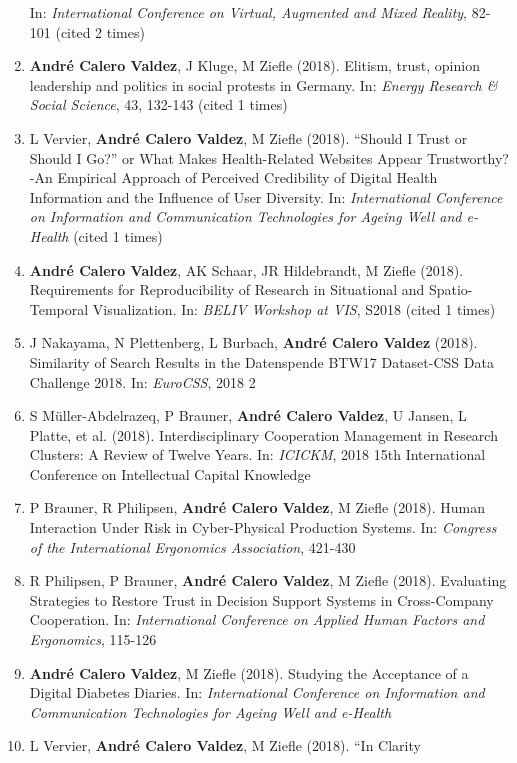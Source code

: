 \documentclass[11pt,a4paper,sans]{moderncv}
\begin{document}
\begin{enumerate}
  In: \emph{International Conference on Virtual, Augmented and Mixed
  Reality}, 82-101 (cited 2 times)
\item
  \textbf{André Calero Valdez}, J Kluge, M Ziefle (2018). Elitism,
  trust, opinion leadership and politics in social protests in Germany.
  In: \emph{Energy Research \& Social Science}, 43, 132-143 (cited 1
  times)
\item
  L Vervier, \textbf{André Calero Valdez}, M Ziefle (2018). ``Should I
  Trust or Should I Go?'' or What Makes Health-Related Websites Appear
  Trustworthy?-An Empirical Approach of Perceived Credibility of Digital
  Health Information and the Influence of User Diversity. In:
  \emph{International Conference on Information and Communication
  Technologies for Ageing Well and e-Health} (cited 1 times)
\item
  \textbf{André Calero Valdez}, AK Schaar, JR Hildebrandt, M Ziefle
  (2018). Requirements for Reproducibility of Research in Situational
  and Spatio-Temporal Visualization. In: \emph{BELIV Workshop at VIS},
  S2018 (cited 1 times)
\item
  J Nakayama, N Plettenberg, L Burbach, \textbf{André Calero Valdez}
  (2018). Similarity of Search Results in the Datenspende BTW17
  Dataset-CSS Data Challenge 2018. In: \emph{EuroCSS}, 2018 2
\item
  S Müller-Abdelrazeq, P Brauner, \textbf{André Calero Valdez}, U
  Jansen, L Platte, et al. (2018). Interdisciplinary Cooperation
  Management in Research Clusters: A Review of Twelve Years. In:
  \emph{ICICKM}, 2018 15th International Conference on Intellectual
  Capital Knowledge~
\item
  P Brauner, R Philipsen, \textbf{André Calero Valdez}, M Ziefle (2018).
  Human Interaction Under Risk in Cyber-Physical Production Systems. In:
  \emph{Congress of the International Ergonomics Association}, 421-430
\item
  R Philipsen, P Brauner, \textbf{André Calero Valdez}, M Ziefle (2018).
  Evaluating Strategies to Restore Trust in Decision Support Systems in
  Cross-Company Cooperation. In: \emph{International Conference on
  Applied Human Factors and Ergonomics}, 115-126
\item
  \textbf{André Calero Valdez}, M Ziefle (2018). Studying the Acceptance
  of a Digital Diabetes Diaries. In: \emph{International Conference on
  Information and Communication Technologies for Ageing Well and
  e-Health}
\item
  L Vervier, \textbf{André Calero Valdez}, M Ziefle (2018). ``In Clarity

\end{enumerate}
\end{document}
